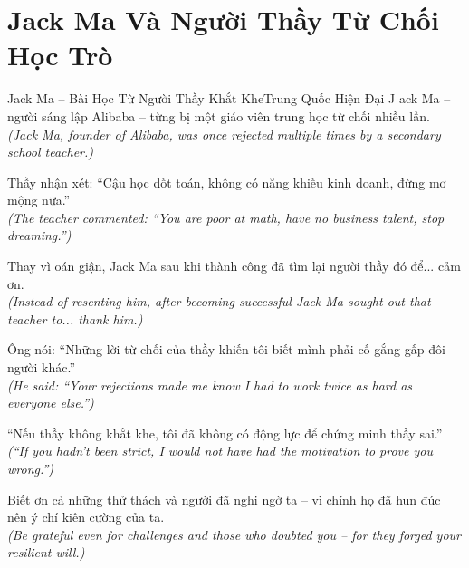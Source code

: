 \section{Jack Ma Và Người Thầy Từ Chối Học Trò}
\begin{truyen}{Jack Ma -- Bài Học Từ Người Thầy Khắt Khe}{Trung Quốc Hiện Đại}
J ack Ma -- người sáng lập Alibaba -- từng bị một giáo viên trung học từ chối nhiều lần.\\
\textit{(Jack Ma, founder of Alibaba, was once rejected multiple times by a secondary school teacher.)}

Thầy nhận xét: ``Cậu học dốt toán, không có năng khiếu kinh doanh, đừng mơ mộng nữa.''\\
\textit{(The teacher commented: ``You are poor at math, have no business talent, stop dreaming.'')}

Thay vì oán giận, Jack Ma sau khi thành công đã tìm lại người thầy đó để... cảm ơn.\\
\textit{(Instead of resenting him, after becoming successful Jack Ma sought out that teacher to... thank him.)}

Ông nói: ``Những lời từ chối của thầy khiến tôi biết mình phải cố gắng gấp đôi người khác.''\\
\textit{(He said: ``Your rejections made me know I had to work twice as hard as everyone else.'')}

``Nếu thầy không khắt khe, tôi đã không có động lực để chứng minh thầy sai.''\\
\textit{(``If you hadn't been strict, I would not have had the motivation to prove you wrong.'')}

\end{truyen}
\begin{baihoc}
  Biết ơn cả những thử thách và người đã nghi ngờ ta -- vì chính họ đã hun đúc nên ý chí kiên cường của ta.\\
  \textit{(Be grateful even for challenges and those who doubted you -- for they forged your resilient will.)}
\end{baihoc}

